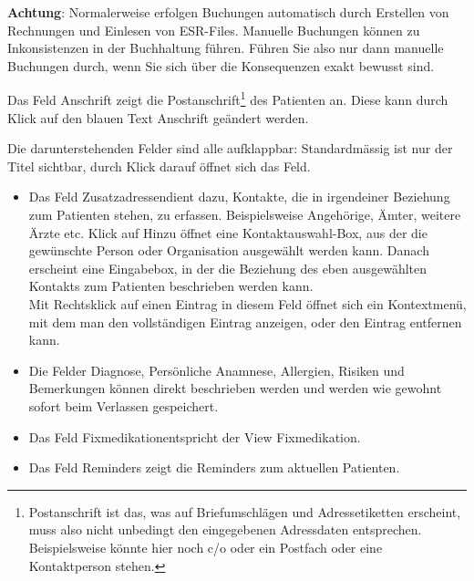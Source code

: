 \textbf{Achtung}: Normalerweise erfolgen Buchungen automatisch durch Erstellen
von Rechnungen und Einlesen von ESR-Files. Manuelle Buchungen können zu
Inkonsistenzen in der Buchhaltung führen. Führen Sie also nur dann manuelle
Buchungen durch, wenn Sie sich über die Konsequenzen exakt bewusst sind.

Das Feld \glqq Anschrift\grqq{} zeigt die Postanschrift\footnote{Postanschrift ist das, was auf Briefumschlägen und Adressetiketten erscheint, muss also nicht unbedingt den eingegebenen Adressdaten entsprechen. Beispielsweise könnte hier noch c/o oder ein Postfach oder eine Kontaktperson stehen.} des Patienten an. Diese
kann durch Klick auf den blauen Text \glqq Anschrift \grqq{}geändert werden.

Die darunterstehenden Felder sind alle aufklappbar: Standardmässig ist nur der
Titel sichtbar, durch Klick darauf öffnet sich das Feld.
\begin{itemize}
  \item Das Feld \glqq Zusatzadressen\grqq{}dient dazu, Kontakte, die in
  irgendeiner Beziehung zum Patienten stehen, zu erfassen. Beispielsweise
  Angehörige, Ämter, weitere Ärzte etc. Klick auf \glqq Hinzu\grqq{} öffnet eine
  Kontaktauswahl-Box, aus der die gewünschte Person oder Organisation ausgewählt
  werden kann. Danach erscheint eine Eingabebox, in der die Beziehung des eben
  ausgewählten Kontakts zum Patienten beschrieben werden kann. \\
  Mit Rechtsklick auf einen Eintrag in diesem Feld öffnet sich ein Kontextmenü,
  mit dem man den vollständigen Eintrag anzeigen, oder den Eintrag entfernen kann.
  \item Die Felder \glqq Diagnose\grqq, \glqq Persönliche Anamnese\grqq{},
  \glqq Allergien\grqq{}, \glqq Risiken\grqq{} und \glqq Bemerkungen \grqq{}
  können direkt beschrieben werden und werden wie gewohnt sofort beim Verlassen
  gespeichert.
  \item Das Feld \glqq Fixmedikation\grqq{}entspricht der View Fixmedikation.
  \item Das Feld \glqq Reminders\grqq{} zeigt die Reminders zum aktuellen Patienten.
\end{itemize}
